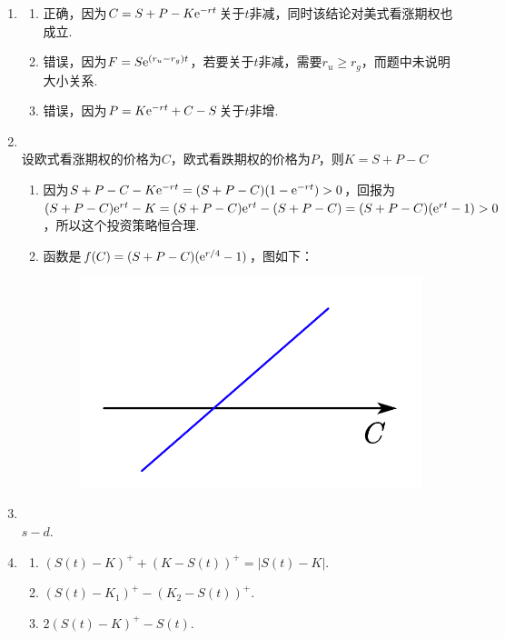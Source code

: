 \begin{enumerate}[label=\arabic{section}.\arabic*]
    \item \sol
    \begin{enumerate}[label=\alph*)]
        \item 正确，因为$C=S+P-K\mathrm{e}^{-rt}$关于$t$非减，同时该结论对美式看涨期权也成立.
        \item 错误，因为$F=S\mathrm{e}^{(r_u-r_g)t}$，若要关于$t$非减，需要$r_u \geq r_g$，而题中未说明大小关系.
        \item 错误，因为$P=K\mathrm{e}^{-rt}+C-S$关于$t$非增.
    \end{enumerate}
    \item \sol\\
    设欧式看涨期权的价格为$C$，欧式看跌期权的价格为$P$，则$K=S+P-C$
    \begin{enumerate}[label=\alph*)]
        \item 因为$S+P-C - K\mathrm{e}^{-rt}=(S+P-C)(1-\mathrm{e}^{-rt})>0$，回报为$(S+P-C)\mathrm{e}^{rt}-K=(S+P-C)\mathrm{e}^{rt}-(S+P-C)=(S+P-C)(\mathrm{e}^{rt}-1)>0$，所以这个投资策略恒合理.
        \item 函数是$f(C)=(S+P-C)(\mathrm{e}^{r/4}-1)$，图如下：
        \begin{figure}[H]
            \centering
            \includegraphics[scale=0.4]{5.18.pdf}
        \end{figure}
    \end{enumerate}
    \item \sol\\ $s-d$.
    \item \sol
    \begin{enumerate}[label=\alph*)]
        \item $(S(t)-K)^++(K-S(t))^+=|S(t)-K|$.
        \item $(S(t)-K_1)^+-(K_2-S(t))^+$.
        \item $2(S(t)-K)^+-S(t)$.

\end{enumerate}
\end{enumerate}
